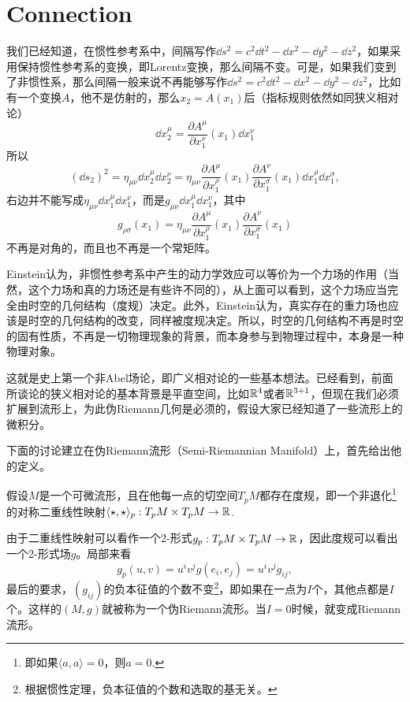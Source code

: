 \chapter{Connection}
\newcommand{\lag}{\mathfrak{g}}
\newcommand{\ad}{\mathrm{ad}}
\newcommand{\gl}{\mathfrak{gl}}

我们已经知道，在惯性参考系中，间隔写作$\dd s^2=c^2 \dd t^2-\dd x^2-\dd y^2-\dd z^2$，如果采用保持惯性参考系的变换，即Lorentz变换，那么间隔不变。可是，如果我们变到了非惯性系，那么间隔一般来说不再能够写作$\dd s^2=c^2 \dd t^2-\dd x^2-\dd y^2-\dd z^2$，比如有一个变换$A$，他不是仿射的，那么$x_2=A(x_1)$后（指标规则依然如同狭义相对论）
\[
	\dd x_2^\mu=\frac{\partial A^\mu}{\partial x_1^\nu}(x_1)\dd x_1^\nu
\]
所以
\[
	(\dd s_2)^2=\eta_{\mu\nu}\dd x_2^\mu\dd x_2^\nu=\eta_{\mu\nu}\frac{\partial A^\mu}{\partial x_1^\rho}(x_1)\frac{\partial A^\nu}{\partial x_1^\sigma}(x_1)\dd x_1^\rho\dd x_1^\sigma,
\]
右边并不能写成$\eta_{\mu\nu}\dd x_1^\mu\dd x_1^\nu$，而是$g_{\mu\nu}\dd x_1^\mu\dd x_1^\nu$，其中
\[
	g_{\rho\sigma}(x_1)=\eta_{\mu\nu}\frac{\partial A^\mu}{\partial x_1^\rho}(x_1)\frac{\partial A^\nu}{\partial x_1^\sigma}(x_1)
\]
不再是对角的，而且也不再是一个常矩阵。

Einstein认为，非惯性参考系中产生的动力学效应可以等价为一个力场的作用（当然，这个力场和真的力场还是有些许不同的），从上面可以看到，这个力场应当完全由时空的几何结构（度规）决定。此外，Einstein认为，真实存在的重力场也应该是时空的几何结构的改变，同样被度规决定。所以，时空的几何结构不再是时空的固有性质，不再是一切物理现象的背景，而本身参与到物理过程中，本身是一种物理对象。

这就是史上第一个非Abel场论，即广义相对论的一些基本想法。已经看到，前面所谈论的狭义相对论的基本背景是平直空间，比如$\mathbb{R}^4$或者$\mathbb{R}^{3+1}$，但现在我们必须扩展到流形上，为此伪Riemann几何是必须的，假设大家已经知道了一些流形上的微积分。

下面的讨论建立在伪Riemann流形（Semi-Riemannian Manifold）上，首先给出他的定义。

\para 假设$M$是一个可微流形，且在他每一点的切空间$T_pM$都存在度规，即一个非退化\footnote{即如果$\langle a,a\rangle=0$，则$a=0$.}的对称二重线性映射$\langle\star,\star\rangle_p:T_pM\times T_pM\to \mathbb{R}$.

由于二重线性映射可以看作一个2-形式$g_p:T_pM\times T_pM\to \mathbb{R}$，因此度规可以看出一个2-形式场$g$。局部来看
\[
	g_p(u,v)=u^iv^jg(e_i,e_j)=u^iv^jg_{ij},
\]
最后的要求，$(g_{ij})$的负本征值的个数不变\footnote{根据惯性定理，负本征值的个数和选取的基无关。}，即如果在一点为$I$个，其他点都是$I$个。这样的$(M,g)$就被称为一个伪Riemann流形。当$I=0$时候，就变成Riemann流形。

